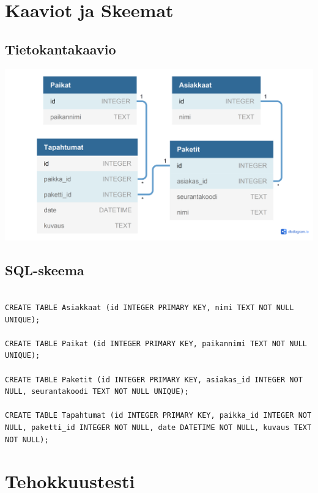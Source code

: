 \documentclass[11pt,a4paper]{article}
\begin{document}
\newpage
\section{Kaaviot ja Skeemat}
\subsection{Tietokantakaavio}
\includegraphics[scale=0.25]{tietokanta_kaavio.png} 

\subsection{SQL-skeema}
\begin{lstlisting}

CREATE TABLE Asiakkaat (id INTEGER PRIMARY KEY, nimi TEXT NOT NULL UNIQUE);

CREATE TABLE Paikat (id INTEGER PRIMARY KEY, paikannimi TEXT NOT NULL UNIQUE);

CREATE TABLE Paketit (id INTEGER PRIMARY KEY, asiakas_id INTEGER NOT NULL, seurantakoodi TEXT NOT NULL UNIQUE);

CREATE TABLE Tapahtumat (id INTEGER PRIMARY KEY, paikka_id INTEGER NOT NULL, paketti_id INTEGER NOT NULL, date DATETIME NOT NULL, kuvaus TEXT NOT NULL);
\end{lstlisting}
\newpage

\section{Tehokkuustesti}
\end{document}
